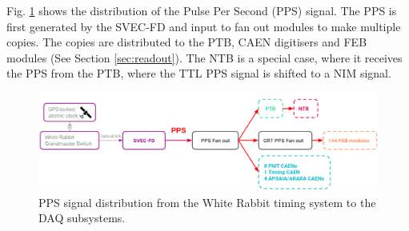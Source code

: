 Fig. \ref{fig:pps_dist} shows the distribution of the Pulse Per Second (PPS) signal.
The PPS is first generated by the SVEC-FD and input to fan out modules to make multiple copies.
The copies are distributed to the PTB, CAEN digitisers and FEB modules (See Section \ref{sec:readout}).
The NTB is a special case, where it receives the PPS from the PTB, where the TTL PPS signal is shifted to a NIM signal.

\begin{figure}[hb!] 
\centering    
\includegraphics[width=1.0\textwidth]{pps_dist}
\caption[PPS Signal Distribution]{
PPS signal distribution from the White Rabbit timing system to the DAQ subsystems. 
}
\label{fig:pps_dist}
\end{figure}

